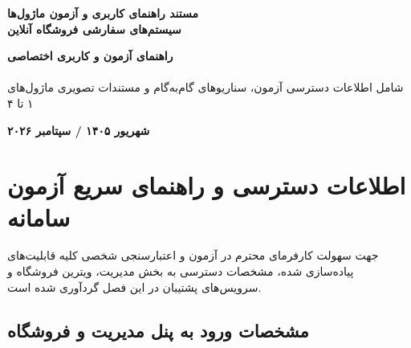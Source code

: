 \documentclass[a4paper,11pt]{report}
\begin{document}
\begin{titlepage}
\begin{center}
    \vspace*{2.5cm}
    {\huge\bfseries\color{primary} مستند راهنمای کاربری و آزمون ماژول‌ها}\\[0.8cm]
    {\LARGE\bfseries\color{secondary} سیستم‌های سفارشی فروشگاه آنلاین }\\[2.5cm]

    \begin{tcolorbox}[colback=lightbg, colframe=primary, arc=4mm, width=0.92\textwidth, boxrule=1.5pt]
        \begin{center}
            {\Large\bfseries راهنمای آزمون و کاربری اختصاصی}\\[1.5mm]
            {\normalsize\bfseries\color{primary}}\\[3mm]
            \small شامل اطلاعات دسترسی آزمون، سناریوهای گام‌به‌گام و مستندات تصویری ماژول‌های ۱ تا ۴
        \end{center}
    \end{tcolorbox}

    \vfill
    {\normalsize\bfseries شهریور ۱۴۰۵ / سپتامبر ۲۰۲۶}\\[0.5cm]
\end{center}
\end{titlepage}

\tableofcontents
\newpage

\chapter[اطلاعات دسترسی و راهنمای سریع آزمون سامانه]{اطلاعات دسترسی و راهنمای سریع آزمون سامانه\\[0.3ex]\large\mdseries{}}

جهت سهولت کارفرمای محترم در آزمون و اعتبارسنجی شخصی کلیه قابلیت‌های پیاده‌سازی شده، مشخصات دسترسی به بخش مدیریت، ویترین فروشگاه و سرویس‌های پشتیبان در این فصل گردآوری شده است.

\section{مشخصات ورود به پنل مدیریت و فروشگاه}
\end{document}
